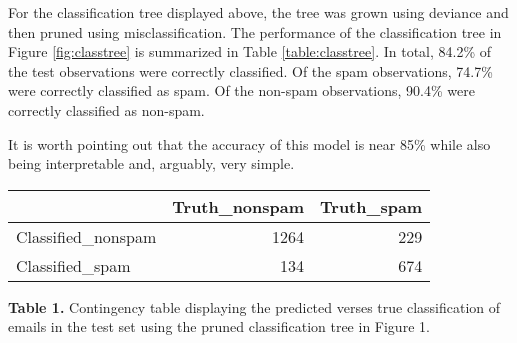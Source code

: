 \documentclass[
]{article}
\begin{document}
\n

For the classification tree displayed above, the tree was grown using deviance and then pruned using misclassification. The performance of the classification tree in Figure \ref{fig:classtree} is summarized in Table \ref{table:classtree}. In total, 84.2\% of the test observations were correctly classified. Of the spam observations, 74.7\% were correctly classified as spam. Of the non-spam observations, 90.4\% were correctly classified as non-spam.

It is worth pointing out that the accuracy of this model is near 85\% while also being interpretable and, arguably, very simple.

\begin{longtable}{l|rr}
\toprule
\multicolumn{1}{l}{} & Truth\_nonspam & Truth\_spam \\ 
\midrule\addlinespace[2.5pt]
Classified\_nonspam & 1264 & 229 \\ 
Classified\_spam & 134 & 674 \\ 
\bottomrule
\end{longtable}

\textbf{Table 1.}\label{table:classtree} Contingency table displaying the predicted verses true classification of emails in the test set using the pruned classification tree in Figure 1.

\n
\end{document}
